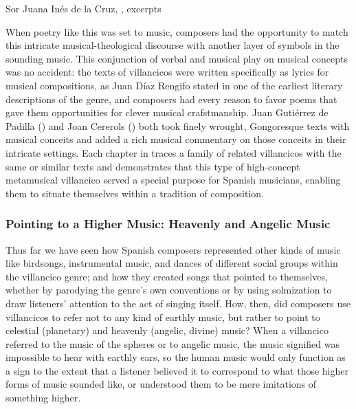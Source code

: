 
{Sor Juana Inés de la Cruz, ,
excerpts}

When poetry like this was set to music, composers had the opportunity to match
this intricate musical-theological discourse with another layer of symbols in
the sounding music.
This conjunction of verbal and musical play on musical concepts was no
accident: the texts of villancicos were written specifically as lyrics for
musical compositions, as Juan Díaz Rengifo stated in one of the earliest
literary descriptions of the genre, and composers had every reason to favor
poems that gave them opportunities for clever musical crafstmanship.%
    \Autocite{Rengifo:ArteMetrica}
Juan Gutiérrez de Padilla () and Joan Cererols
() both took finely wrought, Gongoresque texts with
musical conceits and added a rich musical commentary on those conceits in their
intricate settings.
Each chapter in  traces a family of related
villancicos with the same or similar texts and demonstrates that this type of
high-concept metamusical villancico served a special purpose for Spanish
musicians, enabling them to situate themselves within a tradition of
composition.



\subsubsection{Pointing to a Higher Music: Heavenly and Angelic Music}

Thus far we have seen how Spanish composers represented other kinds of music
like birdsongs, instrumental music, and dances of different social groups
within the villancico genre; and how they created songs that pointed to
themselves, whether by parodying the genre's own conventions or by using
solmization to draw listeners' attention to the act of singing itself.
How, then, did composers use villancicos to refer not to any kind of earthly
music, but rather to point to celestial (planetary) and heavenly (angelic,
divine) music?
When a villancico referred to the music of the spheres or to angelic music, the
music signified was impossible to hear with earthly ears, so the human music
would only function as a sign to the extent that a listener believed it to
correspond to what those higher forms of music sounded like, or understood them
to be mere imitations of something higher.


